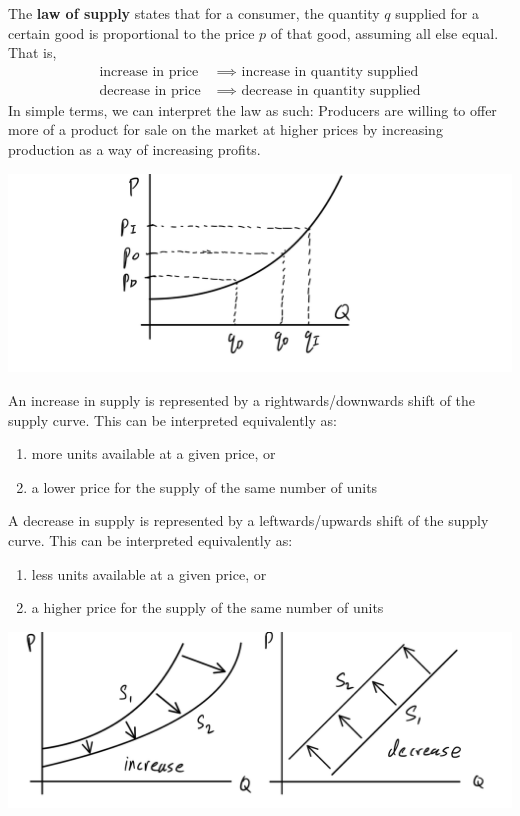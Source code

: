 \documentclass{article}
\begin{document}
    \begin{theorem}
      The \textbf{law of supply} states that for a consumer, the quantity $q$ supplied for a certain good is proportional to the price $p$ of that good, assuming all else equal. That is, 
      \begin{align*}
        \text{increase in price } & \implies \text{ increase in quantity supplied} \\
        \text{decrease in price } & \implies \text{ decrease in quantity supplied}
      \end{align*}
      In simple terms, we can interpret the law as such: Producers are willing to offer more of a product for sale on the market at higher prices by increasing production as a way of increasing profits. 
      \begin{center}
        \includegraphics[scale=0.25]{img/Law_of_Supply.PNG}
      \end{center}
    \end{theorem}

    \begin{definition}
      An increase in supply is represented by a rightwards/downwards shift of the supply curve. This can be interpreted equivalently as: 
      \begin{enumerate}
        \item more units available at a given price, or
        \item a lower price for the supply of the same number of units
      \end{enumerate}
      A decrease in supply is represented by a leftwards/upwards shift of the supply curve. This can be interpreted equivalently as: 
      \begin{enumerate}
        \item less units available at a given price, or 
        \item a higher price for the supply of the same number of units
      \end{enumerate}
      \begin{center}
        \includegraphics[scale=0.25]{img/Shift_in_Supply.PNG}
      \end{center}
    \end{definition}
\end{document}
